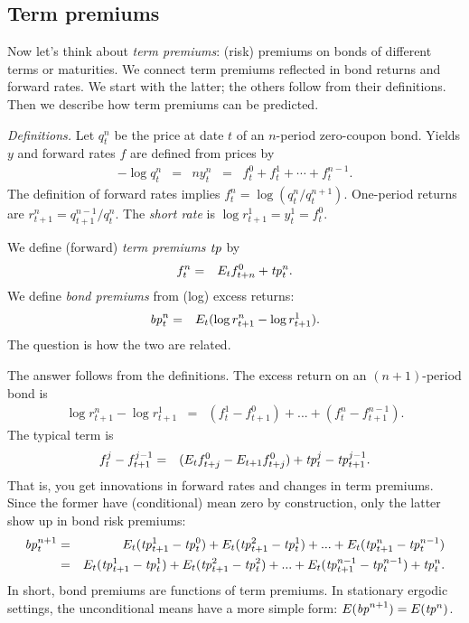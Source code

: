 \documentclass[11pt]{article}
\newcommand{\tp}{\mbox{\it tp\/}}
\newcommand{\bp}{\mbox{\it bp\/}}
\begin{document}
\subsection*{Term premiums}

Now let's think about {\it term premiums\/}:
(risk) premiums on bonds of different terms or maturities.
We connect term premiums
reflected in bond returns and forward rates.
We start with the latter; the others follow from their definitions.
Then we describe how term premiums can be predicted.

{\it Definitions.\/}
Let $q^n_t$ be the price at date $t$ of an $n$-period zero-coupon bond.
Yields $y$ and forward rates $f$ are defined from prices by
\begin{eqnarray*}
    - \log q^n_t  &=&  n y^n_t
            \;\;=\;\;  f^0_t  + f^1_t + \cdots + f^{n-1}_t.
\end{eqnarray*}
The definition of forward rates implies
$ f^n_t = \log (q^n_t/q^{n+1}_t )$.
One-period returns are $  r^n_{t+1} = q^{n-1}_{t+1}/q^n_t $.
The {\it short rate\/} is $\log r^1_{t+1} = y_t^1 = f^0_t $.

We define (forward) {\it term premiums\/} $\tp$ by
\begin{eqnarray}
    f^n_t &=&  E_t f^0_{t+n} + \tp^n_t .
    \label{eq:tp-def}
\end{eqnarray}
We define {\it bond premiums\/} from (log) excess returns:
\begin{eqnarray*}
    \bp^n_t &=& E_t (\log r^n_{t+1}  - \log r^1_{t+1}) .
\end{eqnarray*}
The question is how the two are related.

The answer follows from the definitions.
The excess return on an $(n+1)$-period bond is
\begin{eqnarray*}
   \log r^n_{t+1} - \log r^1_{t+1} &=&
            (f^1_t-f^0_{t+1}) + ... + (f^n_t-f^{n-1}_{t+1}).
\end{eqnarray*}
The typical term is
\begin{eqnarray*}
    f^j_t - f^{j-1}_{t+1} &=&  (E_t f^0_{t+j} - E_{t+1}f^0_{t+j})
        + \tp^j_t - \tp^{j-1}_{t+1} .
\end{eqnarray*}
That is, you get innovations in forward rates and changes in term premiums.  Since the former have (conditional) mean zero by construction, only the latter show up in bond risk premiums:
\begin{eqnarray*}
    \bp^{n+1}_t &=&  E_t (\tp^1_{t+1}-\tp^0_t) + E_t (\tp^2_{t+1}-\tp^1_t)
                    + ... + E_t (\tp^n_{t+1}-\tp^{n-1}_t)       \\
               &=&  E_t (\tp^1_{t+1} - \tp^1_t) + E_t (\tp^2_{t+1}-\tp^2_t)
                  + ... + E_t (\tp^{n-1}_{t+1}-\tp^{n-1}_t) + \tp^n_t .
\end{eqnarray*}
In short, bond premiums are functions of term premiums.
In stationary ergodic settings, the unconditional means have a more simple form: $ E (\bp^{n+1}) = E (\tp^n )$.
\end{document}

